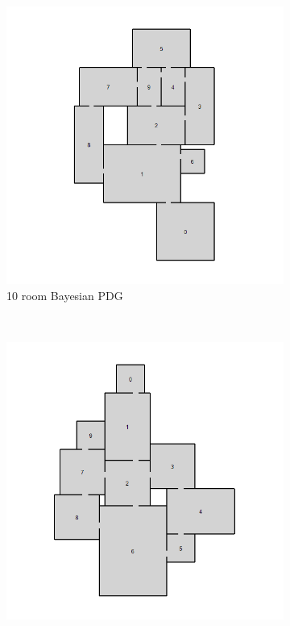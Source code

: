 \documentclass{UoYCSproject}
\begin{document}
\begin{figure}[htb]
  \centering
  \begin{subfigure}[b]{0.35\textwidth}
    \centering
    \includegraphics[width=\textwidth]{figures/generated/BPDG_10_5.jpg}
    \caption{10 room Bayesian PDG}
  \end{subfigure}
  ~
  \begin{subfigure}[b]{0.35\textwidth}
    \centering
    \includegraphics[width=\textwidth]{figures/generated/TheVerminHollow.yaml_7.jpg}

\end{subfigure}
\end{figure}
\end{document}

